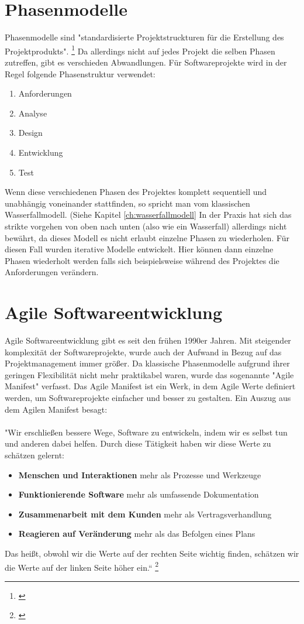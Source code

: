 \documentclass[a4paper, twopage]{scrreprt}
\begin{document}
\section{Phasenmodelle}
\label{sec:phasenmodelle}
Phasenmodelle sind "standardisierte Projektstruckturen für die Erstellung des Projektprodukts". \footnote{\cite{wikipedia:projektphase}}
Da allerdings nicht auf jedes Projekt die selben Phasen zutreffen, gibt es verschieden Abwandlungen. Für Softwareprojekte wird in der Regel folgende Phasenstruktur verwendet:
\begin{enumerate}
	\item Anforderungen
	\item Analyse
	\item Design
	\item Entwicklung
	\item Test
\end{enumerate}
Wenn diese verschiedenen Phasen des Projektes komplett sequentiell und unabhängig voneinander stattfinden, so spricht man vom klassischen Wasserfallmodell. (Siehe Kapitel \ref{ch:wasserfallmodell}
In der Praxis hat sich das strikte vorgehen von oben nach unten (also wie ein Wasserfall) allerdings nicht bewährt, da dieses Modell es nicht erlaubt einzelne Phasen zu wiederholen.
Für diesen Fall wurden iterative Modelle entwickelt. Hier können dann einzelne Phasen wiederholt werden falls sich beispielsweise während des Projektes die Anforderungen verändern.
\section{Agile Softwareentwicklung}
\label{sec:agile_softwareentwicklung}
Agile Softwareentwicklung gibt es seit den frühen 1990er Jahren. Mit steigender komplexität der Softwareprojekte, wurde auch der Aufwand in Bezug auf das Projektmanagement immer größer. Da klassische Phasenmodelle aufgrund ihrer geringen Flexibilität nicht mehr praktikabel waren, wurde das sogenannte "Agile Manifest" verfasst. Das Agile Manifest ist ein Werk, in dem Agile Werte definiert werden, um Softwareprojekte einfacher und besser zu gestalten. Ein Auszug aus dem Agilen Manifest besagt: \paragraph*{}
"Wir erschließen bessere Wege, Software zu entwickeln, indem wir es selbst tun und anderen dabei helfen. Durch diese Tätigkeit haben wir diese Werte zu schätzen gelernt:
\begin{itemize}
	\item \textbf{Menschen und Interaktionen} mehr als Prozesse und Werkzeuge
	\item \textbf{Funktionierende Software} mehr als umfassende Dokumentation
	\item \textbf{Zusammenarbeit mit dem Kunden} mehr als Vertragsverhandlung
	\item \textbf{Reagieren auf Veränderung} mehr als das Befolgen eines Plans
\end{itemize}
Das heißt, obwohl wir die Werte auf der rechten Seite wichtig finden, schätzen wir die Werte auf der linken Seite höher ein.“ \footnote{\cite{agilemanifesto}}
\end{document}
